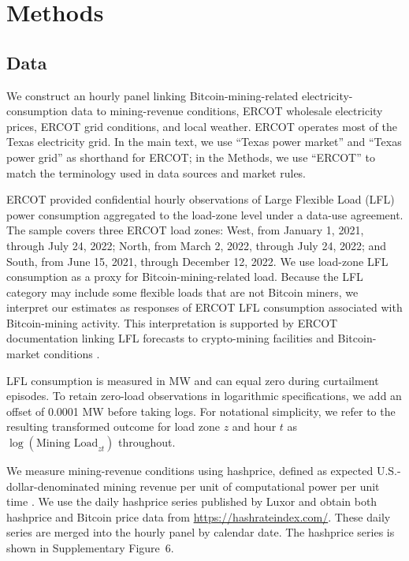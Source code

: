 \documentclass[pdflatex,sn-mathphys-num]{sn-jnl}%
\theoremstyle{thmstyleone}%
\theoremstyle{thmstyletwo}%
\theoremstyle{thmstylethree}%
\begin{document}
\section{Methods}\label{sec11}

\subsection*{Data}
We construct an hourly panel linking Bitcoin-mining-related electricity-consumption data to mining-revenue conditions, ERCOT wholesale electricity prices, ERCOT grid conditions, and local weather. ERCOT operates most of the Texas electricity grid. In the main text, we use ``Texas power market'' and ``Texas power grid'' as shorthand for ERCOT; in the Methods, we use ``ERCOT'' to match the terminology used in data sources and market rules.

ERCOT provided confidential hourly observations of Large Flexible Load (LFL) power consumption aggregated to the load-zone level under a data-use agreement. The sample covers three ERCOT load zones: West, from January 1, 2021, through July 24, 2022; North, from March 2, 2022, through July 24, 2022; and South, from June 15, 2021, through December 12, 2022. We use load-zone LFL consumption as a proxy for Bitcoin-mining-related load. Because the LFL category may include some flexible loads that are not Bitcoin miners, we interpret our estimates as responses of ERCOT LFL consumption associated with Bitcoin-mining activity. This interpretation is supported by ERCOT documentation linking LFL forecasts to crypto-mining facilities and Bitcoin-market conditions \cite{ERCOT_MORA_May2025}.

LFL consumption is measured in MW and can equal zero during curtailment episodes. To retain zero-load observations in logarithmic specifications, we add an offset of 0.0001 MW before taking logs. For notational simplicity, we refer to the resulting transformed outcome for load zone $z$ and hour $t$ as $\log(\text{Mining Load}_{zt})$ throughout.

We measure mining-revenue conditions using hashprice, defined as expected U.S.-dollar-denominated mining revenue per unit of computational power per unit time \cite{LuxorHashprice2025, neumueller2025cambridge}. We use the daily hashprice series published by Luxor and obtain both hashprice and Bitcoin price data from \url{https://hashrateindex.com/}. These daily series are merged into the hourly panel by calendar date. The hashprice series is shown in Supplementary Figure~6.
\end{document}
